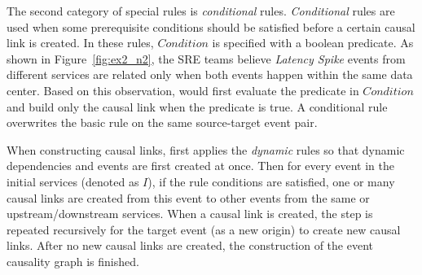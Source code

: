 The second category of special rules is \emph{conditional} rules. \emph{Conditional} rules are used when some prerequisite conditions should be satisfied before a certain causal link is created. In these rules, $Condition$ is specified with a boolean predicate. As shown in Figure~\ref{fig:ex2_n2}, the SRE teams believe \emph{Latency Spike} events from different services are related only when both events happen within the same data center. Based on this observation, \system would first evaluate the predicate in $Condition$ and build only the causal link when the predicate is true. A conditional rule overwrites the basic rule on the same source-target event pair.

When constructing causal links, \system first applies the \emph{dynamic} rules so that dynamic dependencies and events are first created at once. Then for every event in the initial services (denoted as $I$), if the rule conditions are satisfied, one or many causal links are created from this event to other events from the same or upstream/downstream services. When a causal link is created, the step is repeated recursively for the target event (as a new origin) to create new causal links. After no new causal links are created, the construction of the event causality graph is finished.





